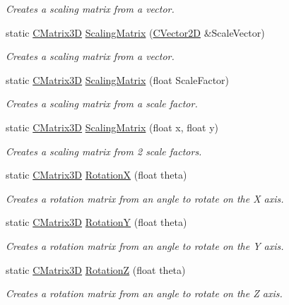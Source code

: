 \begin{DoxyCompactItemize}
\begin{DoxyCompactList}\small\item\em Creates a scaling matrix from a vector. \end{DoxyCompactList}\item 
static \hyperlink{struct_c_matrix3_d}{C\+Matrix3D} \hyperlink{struct_c_matrix3_d_a796a421e8899a83d081e45368811f3bd}{Scaling\+Matrix} (\hyperlink{struct_c_vector2_d}{C\+Vector2D} \&Scale\+Vector)
\begin{DoxyCompactList}\small\item\em Creates a scaling matrix from a vector. \end{DoxyCompactList}\item 
static \hyperlink{struct_c_matrix3_d}{C\+Matrix3D} \hyperlink{struct_c_matrix3_d_ab9ff18305b2466966e388daf345d4bf3}{Scaling\+Matrix} (float Scale\+Factor)
\begin{DoxyCompactList}\small\item\em Creates a scaling matrix from a scale factor. \end{DoxyCompactList}\item 
static \hyperlink{struct_c_matrix3_d}{C\+Matrix3D} \hyperlink{struct_c_matrix3_d_a2cb589e97f1bb2a3d43581372a6c6487}{Scaling\+Matrix} (float x, float y)
\begin{DoxyCompactList}\small\item\em Creates a scaling matrix from 2 scale factors. \end{DoxyCompactList}\item 
static \hyperlink{struct_c_matrix3_d}{C\+Matrix3D} \hyperlink{struct_c_matrix3_d_a94cb71f5a3148d6933eaf831032145fe}{RotationX} (float theta)
\begin{DoxyCompactList}\small\item\em Creates a rotation matrix from an angle to rotate on the X axis. \end{DoxyCompactList}\item 
static \hyperlink{struct_c_matrix3_d}{C\+Matrix3D} \hyperlink{struct_c_matrix3_d_ab8badf53c5fa4f760a450e321a851807}{RotationY} (float theta)
\begin{DoxyCompactList}\small\item\em Creates a rotation matrix from an angle to rotate on the Y axis. \end{DoxyCompactList}\item 
static \hyperlink{struct_c_matrix3_d}{C\+Matrix3D} \hyperlink{struct_c_matrix3_d_ae0665c00512b46d2a2ad87caf18bdfdb}{RotationZ} (float theta)
\begin{DoxyCompactList}\small\item\em Creates a rotation matrix from an angle to rotate on the Z axis. \end{DoxyCompactList}\end{DoxyCompactItemize}
